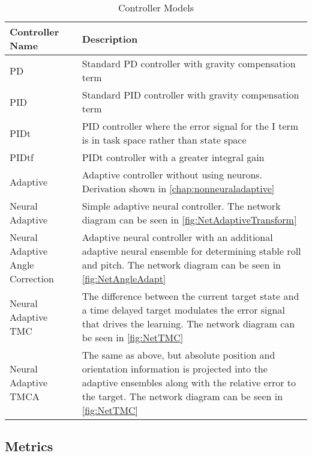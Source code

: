 \documentclass[letterpaper,12pt,titlepage,oneside,final]{book}
\begin{document}
\begin{table}
\caption{Controller Models} \label{table:controller_models}
\begin{center}
\begin{tabular}{| l | p{9cm} |}

\hline
\textbf{Controller Name} & \textbf{Description} \\ \hline
PD & Standard PD controller with gravity compensation term \\ \hline
PID & Standard PID controller with gravity compensation term \\ \hline
PIDt & PID controller where the error signal for the I term is in task space rather than state space \\ \hline
PIDtf & PIDt controller with a greater integral gain \\ \hline
Adaptive &  Adaptive controller without using neurons. Derivation shown in \autoref{chap:nonneuraladaptive} \\ \hline %
Neural Adaptive & Simple adaptive neural controller. The network diagram can be seen in \autoref{fig:NetAdaptiveTransform} \\ \hline
Neural Adaptive Angle Correction & Adaptive neural controller with an additional adaptive neural ensemble for determining stable roll and pitch. The network diagram can be seen in \autoref{fig:NetAngleAdapt} \\ \hline
Neural Adaptive TMC & The difference between the current target state and a time delayed target modulates the error signal that drives the learning. The network diagram can be seen in \autoref{fig:NetTMC} \\ \hline
Neural Adaptive TMCA & The same as above, but absolute position and orientation information is projected into the adaptive ensembles along with the relative error to the target. The network diagram can be seen in \autoref{fig:NetTMC} \\ \hline

\end{tabular}
\end{center}
\end{table}

\subsection{Metrics}
\end{document}
